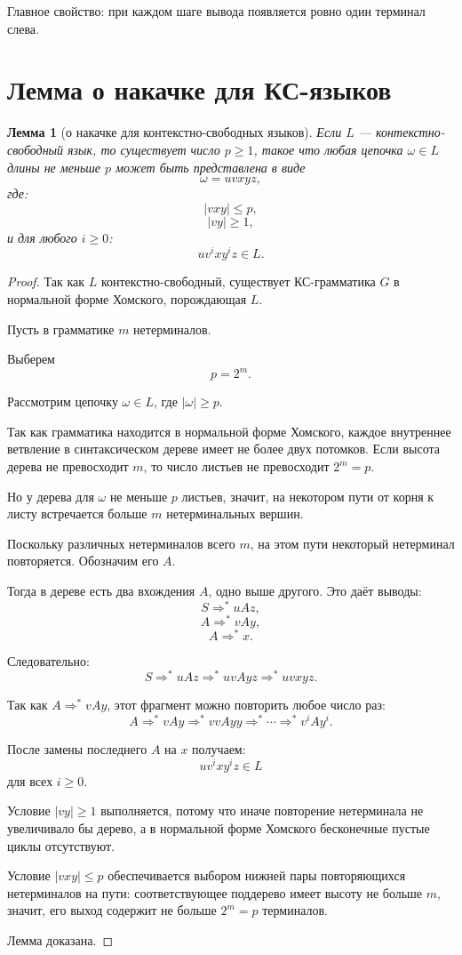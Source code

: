 \documentclass[12pt,a4paper]{article}
\newtheorem{lemma}{Лемма}
\newcommand{\derivesstar}{\Rightarrow^{*}}
\begin{document}
Главное свойство: при каждом шаге вывода появляется ровно один терминал слева.

\section{Лемма о накачке для КС-языков}

\begin{lemma}[о накачке для контекстно-свободных языков]
Если $L$ --- контекстно-свободный язык, то существует число $p\ge 1$, такое что любая цепочка $\omega\in L$ длины не меньше $p$ может быть представлена в виде
\[
\omega=uvxyz,
\]
где:
\[
|vxy|\le p,
\]
\[
|vy|\ge 1,
\]
и для любого $i\ge 0$:
\[
uv^i x y^i z\in L.
\]
\end{lemma}

\begin{proof}
Так как $L$ контекстно-свободный, существует КС-грамматика $G$ в нормальной форме Хомского, порождающая $L$.

Пусть в грамматике $m$ нетерминалов.

Выберем
\[
p=2^m.
\]

Рассмотрим цепочку $\omega\in L$, где $|\omega|\ge p$.

Так как грамматика находится в нормальной форме Хомского, каждое внутреннее ветвление в синтаксическом дереве имеет не более двух потомков. Если высота дерева не превосходит $m$, то число листьев не превосходит $2^m=p$.

Но у дерева для $\omega$ не меньше $p$ листьев, значит, на некотором пути от корня к листу встречается больше $m$ нетерминальных вершин.

Поскольку различных нетерминалов всего $m$, на этом пути некоторый нетерминал повторяется. Обозначим его $A$.

Тогда в дереве есть два вхождения $A$, одно выше другого. Это даёт выводы:
\[
S\derivesstar uAz,
\]
\[
A\derivesstar vAy,
\]
\[
A\derivesstar x.
\]

Следовательно:
\[
S\derivesstar uAz
\derivesstar uvAyz
\derivesstar uvxyz.
\]

Так как $A\derivesstar vAy$, этот фрагмент можно повторить любое число раз:
\[
A\derivesstar vAy\derivesstar vvAyy\derivesstar \cdots \derivesstar v^i A y^i.
\]

После замены последнего $A$ на $x$ получаем:
\[
uv^i x y^i z\in L
\]
для всех $i\ge 0$.

Условие $|vy|\ge 1$ выполняется, потому что иначе повторение нетерминала не увеличивало бы дерево, а в нормальной форме Хомского бесконечные пустые циклы отсутствуют.

Условие $|vxy|\le p$ обеспечивается выбором нижней пары повторяющихся нетерминалов на пути: соответствующее поддерево имеет высоту не больше $m$, значит, его выход содержит не больше $2^m=p$ терминалов.

Лемма доказана.
\end{proof}
\end{document}
